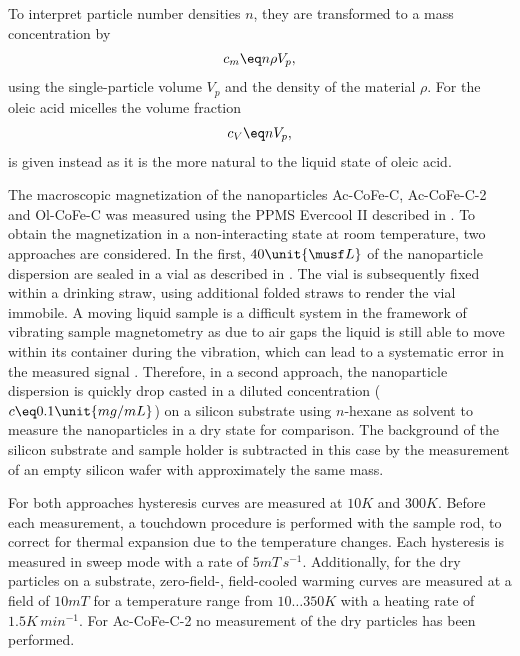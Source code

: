 \documentclass[\main/dresen_thesis.tex]{subfiles}
\begin{document}
    To interpret particle number densities $n$, they are transformed to a mass concentration by
    \begin{align}
      c_m \eq n \rho V_p,
    \end{align}
    using the single-particle volume $V_p$ and the density of the material $\rho$.
    For the oleic acid micelles the volume fraction
    \begin{align}
      c_V \eq n V_p,
    \end{align}
    is given instead as it is the more natural to the liquid state of oleic acid.

    The macroscopic magnetization of the nanoparticles Ac-CoFe-C, Ac-CoFe-C-2 and Ol-CoFe-C was measured using the PPMS Evercool II described in .
    To obtain the magnetization in a non-interacting state at room temperature, two approaches are considered.
    In the first, $40 \unit{\musf L}$ of the nanoparticle dispersion are sealed in a vial as described in .
    The vial is subsequently fixed within a drinking straw, using additional folded straws to render the vial immobile.
    A moving liquid sample is a difficult system in the framework of vibrating sample magnetometry as due to air gaps the liquid is still able to move within its container during the vibration, which can lead to a systematic error in the measured signal \cite{Boekelheide_2016_Artif}.
    Therefore, in a second approach, the nanoparticle dispersion is quickly drop casted in a diluted concentration ($c \eq 0.1 \unit{mg/mL}$) on a silicon substrate using $\textit{n}$-hexane as solvent to measure the nanoparticles in a dry state for comparison.
    The background of the silicon substrate and sample holder is subtracted in this case by the measurement of an empty silicon wafer with approximately the same mass.

    For both approaches hysteresis curves are measured at $10 \unit{K}$ and $300 \unit{K}$.
    Before each measurement, a touchdown procedure is performed with the sample rod, to correct for thermal expansion due to the temperature changes.
    Each hysteresis is measured in sweep mode with a rate of $5 \unit{mT \, s^{-1}}$.
    Additionally, for the dry particles on a substrate, zero-field-, field-cooled warming curves are measured at a field of $10 \unit{mT}$ for a temperature range from $10 \ldots 350 \unit{K}$ with a heating rate of $1.5 \unit{K \, min^{-1}}$.
    For Ac-CoFe-C-2 no measurement of the dry particles has been performed.
\end{document}
